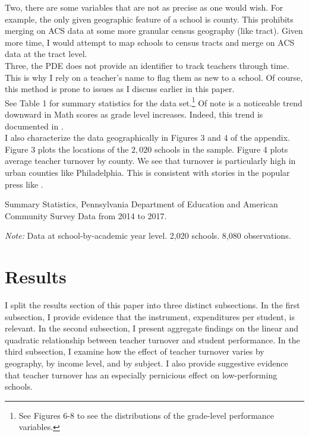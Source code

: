 \documentclass[12pt]{report}
\begin{document}
\indent Two, there are some variables that are not as precise as one would wish. For example, the only given geographic feature of a school is county. This prohibits merging on ACS data at some more granular census geography (like tract). Given more time, I would attempt to map schools to census tracts and merge on ACS data at the tract level.\\
\indent Three, the PDE does not provide an identifier to track teachers through time. This is why I rely on a teacher's name to flag them as new to a school. Of course, this method is prone to issues as I discuss earlier in this paper.\\
\indent See Table 1 for summary statistics for the data set.\footnote{See Figures 6-8 to see the distributions of the grade-level performance variables.} Of note is a noticeable trend downward in Math scores as grade level increases. Indeed, this trend is documented in \cite{lancaster}. \\
\indent I also characterize the data geographically in Figures 3 and 4 of the appendix. Figure 3 plots the locations of the $2,020$ schools in the sample. Figure 4 plots average teacher turnover by county. We see that turnover is particularly high in urban counties like Philadelphia. This is consistent with stories in the popular press like \cite{phl}.

\begin{table}[h!]\centering
\def\sym#1{\ifmmode^{#1}\else\(^{#1}\)\fi}
\caption{Summary Statistics, Pennsylvania Department of Education and American Community Survey Data from 2014 to 2017.}

\caption*{\textit{Note:} Data at school-by-academic year level. 2,020 schools. 8,080 observations.}
\end{table}
\clearpage
\section{Results}
\noindent I split the results section of this paper into three distinct subsections. In the first subsection, I provide evidence that the instrument, expenditures per student, is relevant. In the second subsection, I present aggregate findings on the linear and quadratic relationship between teacher turnover and student performance. In the third subsection, I examine how the effect of teacher turnover varies by geography, by income level, and by subject. I also provide suggestive evidence that teacher turnover has an especially pernicious effect on low-performing schools.
\end{document}
